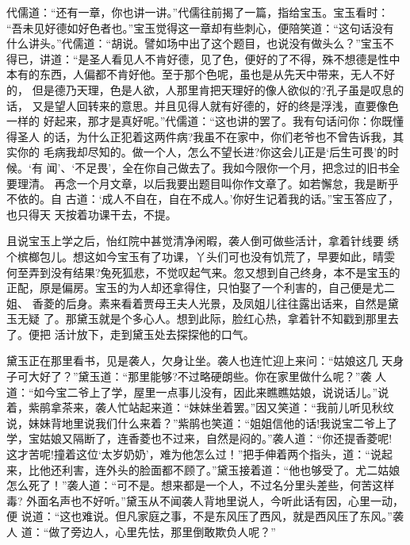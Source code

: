 代儒道：“还有一章，你也讲一讲。”代儒往前揭了一篇，指给宝玉。宝玉看时：
“吾未见好德如好色者也。”宝玉觉得这一章却有些刺心，便陪笑道：“这句话没有
什么讲头。”代儒道：“胡说。譬如场中出了这个题目，也说没有做头么？”宝玉不
得已，讲道：“是圣人看见人不肯好德，见了色，便好的了不得，殊不想德是性中
本有的东西，人偏都不肯好他。至于那个色呢，虽也是从先天中带来，无人不好的，
但是德乃天理，色是人欲，人那里肯把天理好的像人欲似的?孔子虽是叹息的话，
又是望人回转来的意思。并且见得人就有好德的，好的终是浮浅，直要像色一样的
好起来，那才是真好呢。”代儒道：“这也讲的罢了。我有句话问你：你既懂得圣人
的话，为什么正犯着这两件病?我虽不在家中，你们老爷也不曾告诉我，其实你的
毛病我却尽知的。做一个人，怎么不望长进?你这会儿正是‘后生可畏’的时候。‘有
闻’、‘不足畏’，全在你自己做去了。我如今限你一个月，把念过的旧书全要理清。
再念一个月文章，以后我要出题目叫你作文章了。如若懈怠，我是断乎不依的。自
古道：‘成人不自在，自在不成人。’你好生记着我的话。”宝玉答应了，也只得天
天按着功课干去，不提。

且说宝玉上学之后，怡红院中甚觉清净闲暇，袭人倒可做些活计，拿着针线要
绣个槟榔包儿。想这如今宝玉有了功课，丫头们可也没有饥荒了，早要如此，晴雯
何至弄到没有结果?兔死狐悲，不觉叹起气来。忽又想到自己终身，本不是宝玉的
正配，原是偏房。宝玉的为人却还拿得住，只怕娶了一个利害的，自己便是尤二姐、
香菱的后身。素来看着贾母王夫人光景，及凤姐儿往往露出话来，自然是黛玉无疑
了。那黛玉就是个多心人。想到此际，脸红心热，拿着针不知戳到那里去了。便把
活计放下，走到黛玉处去探探他的口气。

黛玉正在那里看书，见是袭人，欠身让坐。袭人也连忙迎上来问：“姑娘这几
天身子可大好了？”黛玉道：“那里能够?不过略硬朗些。你在家里做什么呢？”袭
人道：“如今宝二爷上了学，屋里一点事儿没有，因此来瞧瞧姑娘，说说话儿。”说
着，紫鹃拿茶来，袭人忙站起来道：“妹妹坐着罢。”因又笑道：“我前儿听见秋纹
说，妹妹背地里说我们什么来着？”紫鹃也笑道：“姐姐信他的话!我说宝二爷上了
学，宝姑娘又隔断了，连香菱也不过来，自然是闷的。”袭人道：“你还提香菱呢!
这才苦呢!撞着这位‘太岁奶奶’，难为他怎么过！”把手伸着两个指头，道：“说起
来，比他还利害，连外头的脸面都不顾了。”黛玉接着道：“他也够受了。尤二姑娘
怎么死了！”袭人道：“可不是。想来都是一个人，不过名分里头差些，何苦这样毒?
外面名声也不好听。”黛玉从不闻袭人背地里说人，今听此话有因，心里一动，便
说道：“这也难说。但凡家庭之事，不是东风压了西风，就是西风压了东风。”袭人
道：“做了旁边人，心里先怯，那里倒敢欺负人呢？”

